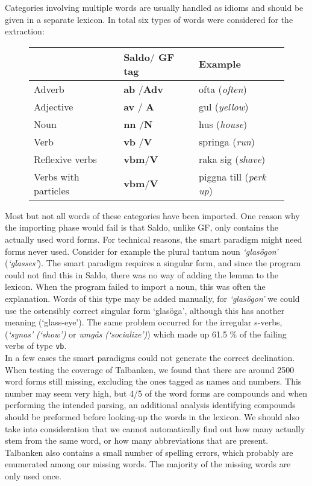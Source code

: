 \documentclass[10pt, a4paper]{article}
\begin{document}
Categories involving multiple words 
are usually handled as idioms and should be given in a separate lexicon. In
total six types of words were considered for the extraction: \\

\begin{figure}[h]
\begin{tabular}{|l|ll|}
\hline
& Saldo$/$ GF tag & Example \\
\hline
 Adverb & \textbf{ab} $/$\textbf{Adv} & ofta (\emph{often})\\
 Adjective&\textbf{av} $/$    \textbf{A} & gul (\emph{yellow})\\
 Noun & \textbf{nn} $/$\textbf{N} & hus (\emph{house})\\
 Verb & \textbf{vb} $/$\textbf{V} & springa (\emph{run})\\
 Reflexive verbs  & \textbf{vbm}$/$\textbf{V} & raka sig (\emph{shave})\\
 Verbs with particles &\textbf{vbm}$/$\textbf{V}  &  piggna till (\emph{perk up})\\
\hline
\end{tabular}
\caption{}
\end{figure}

Most but not all words of these categories have been imported.
One reason why the importing phase would fail 
is that Saldo, unlike GF, only contains the actually used word forms.
For technical reasons, the smart paradigm might need forms never used.
Consider for example the plural tantum 
noun \emph{`glas{\"o}gon'} (\emph{`glasses'}).
The smart paradigm requires a singular form, and since the program could not
find this in Saldo, there was no way of adding the lemma to the lexicon. 
When the program failed to import a noun, this was often the explanation.
Words of this type may be added manually, for \emph{`glas{\"o}gon'} we could use
the ostensibly correct singular form `glas{\"o}ga', although this
has another meaning (`glass-eye').
The same problem occurred for the irregular s-verbs,
(\emph{`synas'} \emph{(`show')} or \emph{umg{\aa}s} \emph{(`socialize')})
which made up 61.5 \% of the failing verbs of type \verb_vb_.\\
In a few cases the smart paradigms could not generate the correct declination.\\

When testing the coverage of Talbanken,
we found that there are around 2500 word forms still missing, excluding the ones
tagged as names and numbers. This number may seem very high, but 
4/5 of the word forms are compounds and when performing the intended parsing,
an additional analysis identifying compounds should be preformed before
looking-up the words in the lexicon. We
should also take into consideration that 
we cannot automatically find out how many actually stem from the same word, or
how many abbreviations that are present. Talbanken also contains a small number of 
spelling errors, which probably are enumerated among our missing words. The majority
of the missing words are only used once.\\
\end{document}
